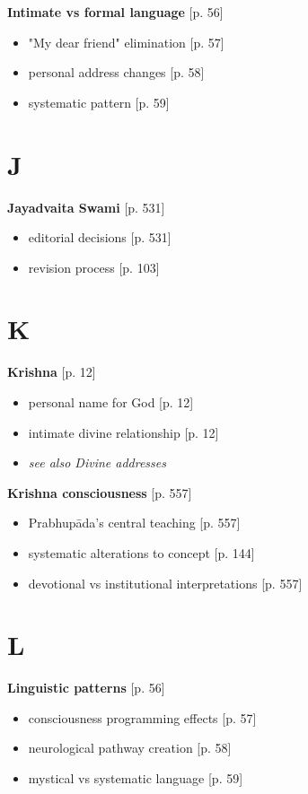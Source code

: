 \documentclass[11pt,twoside]{book}
\begin{document}
\textbf{\textbf{Intimate vs formal language}} {[}p. 56]
\begin{itemize}
\item "My dear friend" elimination [p. 57]
\item personal address changes [p. 58]
\item systematic pattern [p. 59]
\end{itemize}
\section*{J}
\label{sec:org838e9cb}

\textbf{\textbf{Jayadvaita Swami}} {[}p. 531]
\begin{itemize}
\item editorial decisions [p. 531]
\item revision process [p. 103]
\end{itemize}
\section*{K}
\label{sec:org84279b6}

\textbf{\textbf{Krishna}} {[}p. 12]
\begin{itemize}
\item personal name for God [p. 12]
\item intimate divine relationship [p. 12]
\item \emph{see also Divine addresses}
\end{itemize}

\textbf{\textbf{Krishna consciousness}} {[}p. 557]
\begin{itemize}
\item Prabhupāda's central teaching [p. 557]
\item systematic alterations to concept [p. 144]
\item devotional vs institutional interpretations [p. 557]
\end{itemize}
\section*{L}
\label{sec:org824e78d}

\textbf{\textbf{Linguistic patterns}} {[}p. 56]
\begin{itemize}
\item consciousness programming effects [p. 57]
\item neurological pathway creation [p. 58]
\item mystical vs systematic language [p. 59]
\end{itemize}
\end{document}
